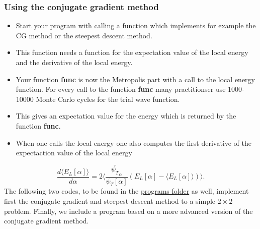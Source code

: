 \documentclass{beamer}
\begin{document}
\begin{frame}
\frametitle{Using the conjugate gradient method}

\begin{block}{}
\begin{itemize}
  \item Start your program with calling a function which implements for example the  CG method  or the steepest descent method. 

  \item This function needs a function for the expectation value of the local energy and the derivative of the local energy.

  \item Your function \textbf{func} is now the Metropolis part with a call to the local energy function. For every call to the function \textbf{func} many practitionser use 1000-10000 Monte Carlo cycles for the trial wave function.

  \item This gives an expectation value for the energy which is returned by the function \textbf{func}.

  \item When one calls the local energy one also computes the first derivative of the expectaction value of the local energy  
\end{itemize}

\noindent
\begin{equation*} \frac{d\langle E_{L}[\alpha] \rangle}{d\alpha}= 2\langle \frac{\bar{\psi_T}_{\alpha}}{\psi_T[\alpha]}\left(E_L[\alpha]-\langle  E_L[\alpha]\rangle\right)\rangle.
\end{equation*}
The following two codes, to be found in the \href{{https://github.com/CompPhysics/ComputationalPhysics2/tree/gh-pages/doc/pub/cg/programs/c%

\end{block}
\end{frame}
\end{document}
